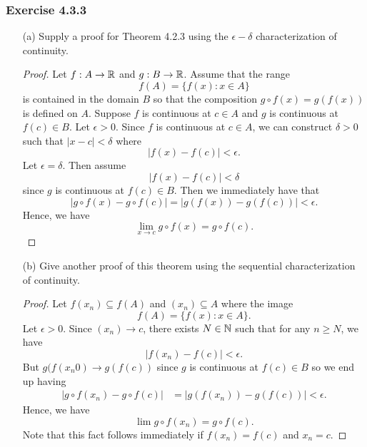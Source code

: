 \subsubsection{Exercise 4.3.3} 
\begin{enumerate}
    \item[(a)] Supply a proof for Theorem 4.2.3 using the \( \epsilon - \delta \) characterization of continuity.
        \begin{proof}
        Let \( f: A \to \mathbb{R}  \) and \( g: B \to \mathbb{R}  \). Assume that the range 
        \[  f(A) = \{ f(x) : x \in A  \}  \] is contained in the domain \( B  \) so that the composition \( g \circ f (x) = g(f(x)) \) is defined on \( A  \). Suppose \( f  \) is continuous at \( c \in A  \) and \( g  \) is continuous at \( f(c) \in B  \). Let \( \epsilon > 0  \). Since \( f \) is continuous at \( c \in  A  \), we can construct \( \delta > 0  \) such that  \( | x - c | < \delta  \) where
        \[ | f(x) - f(c)   | < \epsilon. \] Let \( \epsilon  = \delta  \). Then assume 
        \[ | f(x) - f(c)  | < \delta \] since \( g \) is continuous at \( f(c) \in B  \). Then we immediately have that 
        \[ | g \circ f (x) - g \circ f(c) | = | g(f(x)) - g(f(c)) | < \epsilon. \]
        Hence, we have 
        \[  \lim_{ x  \to c } g \circ f (x) = g \circ f(c). \]
        \end{proof}
    \item[(b)] Give another proof of this theorem using the sequential characterization of continuity.
        \begin{proof}
        Let \( f(x_n) \subseteq f(A) \) and \( (x_n) \subseteq A \) where the image 
        \[ f(A) = \{ f(x) : x \in A  \} .\]
        Let \( \epsilon > 0  \). Since \( (x_n) \to c  \), there exists \( N \in \mathbb{N}  \) such that for any \( n \geq N  \), we have 
        \[  | f(x_n)  - f(c)| < \epsilon. \]
        But \( g(f(x_n0) \to g(f(c)) \) since \( g \) is continuous at \( f(c)\in B  \) so we end up having 
        \begin{align*}
           | g \circ f(x_n) - g \circ f(c) |  &= |  g(f(x_n)) - g(f(c))| < \epsilon.
        \end{align*}
        Hence, we have 
        \[ \lim g \circ f(x_n) = g \circ f (c).  \]
        Note that this fact follows immediately if \( f(x_n) = f(c) \) and \( x_n = c  \).
        \end{proof}
\end{enumerate}


